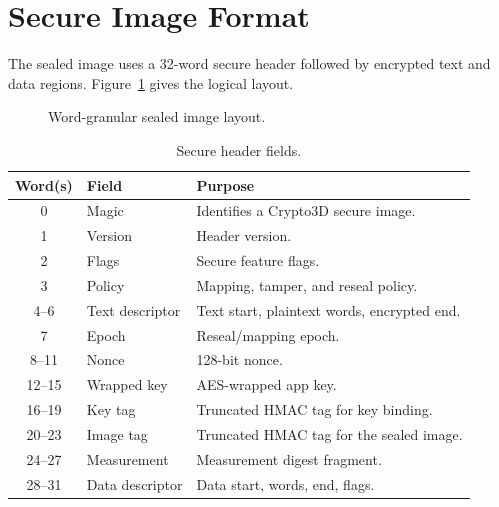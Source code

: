 \documentclass[conference]{IEEEtran}
\begin{document}
\section{Secure Image Format}

The sealed image uses a 32-word secure header followed by encrypted text and data regions. Figure~\ref{fig:layout} gives the logical layout.

\begin{figure}[!t]
\centering
{}
\caption{Word-granular sealed image layout.}
\label{fig:layout}
\end{figure}

\begin{table}[!t]
\caption{Secure header fields.}
\label{tab:header}
\centering
\scriptsize
\begin{tabularx}{\columnwidth}{@{}c L{0.25\columnwidth} Y@{}}
\toprule
Word(s) & Field & Purpose \\
 & Magic & Identifies a Crypto3D secure image. \\
1 & Version & Header version. \\
2 & Flags & Secure feature flags. \\
3 & Policy & Mapping, tamper, and reseal policy. \\
4--6 & Text descriptor & Text start, plaintext words, encrypted end. \\
7 & Epoch & Reseal/mapping epoch. \\
8--11 & Nonce & 128-bit nonce. \\
12--15 & Wrapped key & AES-wrapped app key. \\
16--19 & Key tag & Truncated HMAC tag for key binding. \\
20--23 & Image tag & Truncated HMAC tag for the sealed image. \\
24--27 & Measurement & Measurement digest fragment. \\
28--31 & Data descriptor & Data start, words, end, flags. \\
\bottomrule
\end{tabularx}
\end{table}
\end{document}
